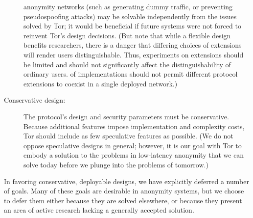 \documentclass[times,10pt,twocolumn]{article}
\begin{document}
\begin{description}
  anonymity networks (such as generating dummy traffic, or preventing
  pseudospoofing attacks) may be solvable independently from the issues
  solved by Tor; it would be beneficial if future systems were not forced to
  reinvent Tor's design decisions.  (But note that while a flexible design
  benefits researchers, there is a danger that differing choices of
  extensions will render users distinguishable.  Thus, experiments
  on extensions should be limited and should not significantly affect
  the distinguishability of ordinary users.
  of implementations should
  not permit different protocol extensions to coexist in a single deployed
  network.)
\item[Conservative design:] The protocol's design and security parameters
  must be conservative.  Because additional features impose implementation
  and complexity costs, Tor should include as few speculative features as
  possible.  (We do not oppose speculative designs in general; however, it is
  our goal with Tor to embody a solution to the problems in low-latency
  anonymity that we can solve today before we plunge into the problems of
  tomorrow.)
\end{description}

\label{subsec:non-goals}
In favoring conservative, deployable designs, we have explicitly deferred
a number of goals. Many of these goals are desirable in anonymity systems,
but we choose to defer them either because they are solved elsewhere,
or because they present an area of active research lacking a generally
accepted solution.
\end{document}
